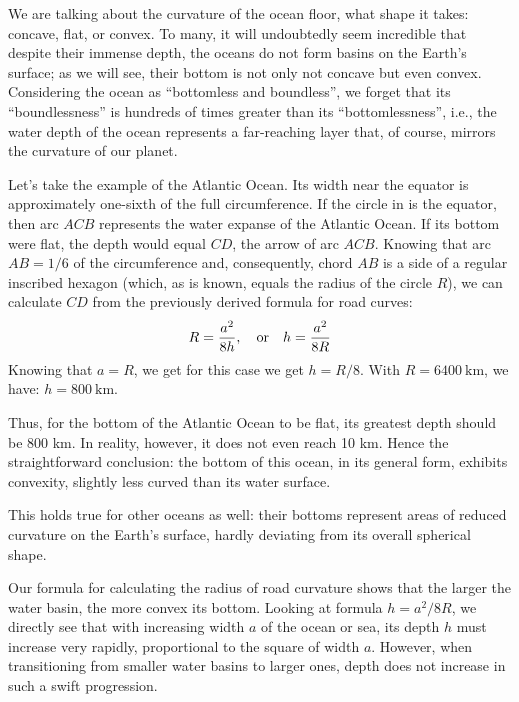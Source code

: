 We are talking about the curvature of the ocean floor, what shape it takes: concave, flat, or convex. To many, it will undoubtedly seem incredible that despite their immense depth, the oceans do not form basins on the Earth's surface; as we will see, their bottom is not only not concave but even convex. Considering the ocean as ``bottomless and boundless'', we forget that its ``boundlessness'' is hundreds of times greater than its ``bottomlessness'', i.e., the water depth of the ocean represents a far-reaching layer that, of course, mirrors the curvature of our planet.

Let's take the example of the Atlantic Ocean. Its width near the equator is approximately one-sixth of the full circumference. If the circle in  is the equator, then arc $ACB$ represents the water expanse of the Atlantic Ocean. If its bottom were flat, the depth would equal $CD$, the arrow of arc $ACB$. Knowing that arc $AB = 1/6$ of the circumference and, consequently, chord $AB$ is a side of a regular inscribed hexagon (which, as is known, equals the radius of the circle $R$), we can calculate $CD$ from the previously derived formula for road curves:
\begin{equation*}%
R = \frac{a^{2}}{8h}, \qor h = \frac{a^{2}}{8R}
\end{equation*}
Knowing that $a = R$, we get for this case we get $h = R/8$. With $R = \SI{6400}{\kilo\meter}$, we have: $h = \SI{800}{\kilo\meter}$.

Thus, for the bottom of the Atlantic Ocean to be flat, its greatest depth should be 800 km. In reality, however, it does not even reach 10 km. Hence the straightforward conclusion: the bottom of this ocean, in its general form, exhibits convexity, slightly less curved than its water surface.

This holds true for other oceans as well: their bottoms represent areas of reduced curvature on the Earth's surface, hardly deviating from its overall spherical shape.

Our formula for calculating the radius of road curvature shows that the larger the water basin, the more convex its bottom. Looking at formula $h = a^{2}/8R$, we directly see that with increasing width $a$ of the ocean or sea, its depth $h$ must increase very rapidly, proportional to the square of width $a$. However, when transitioning from smaller water basins to larger ones, depth does not increase in such a swift progression. 

